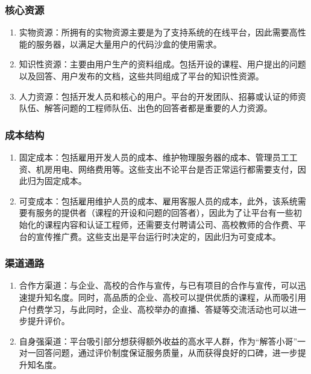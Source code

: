 \documentclass[a4paper]{ctexart}
\begin{document}
\subsubsection{核心资源}

\begin{enumerate}[label=\alph*.]
  \item 实物资源：所拥有的实物资源主要是为了支持系统的在线平台，因此需要高性能的服务器，以满足大量用户的代码沙盒的使用需求。
  \item 知识性资源：主要由用户生产的资料组成。包括开设的课程、用户提出的问题以及回答、用户发布的文档，这些共同组成了平台的知识性资源。
  \item 人力资源：包括开发人员和核心的用户。平台的开发团队、招募或认证的师资队伍、解答问题的工程师队伍、出色的回答者都是重要的人力资源。
\end{enumerate}

\subsubsection{成本结构}

\begin{enumerate}[label=\alph*.]
  \item 固定成本：包括雇用开发人员的成本、维护物理服务器的成本、管理员工工资、机房用电、网络费用等。这些支出不论平台是否正常运行都需要支付，因此归为固定成本。
  \item 可变成本：包括雇用维护人员的成本、雇用客服人员的成本，此外，该系统需要有服务的提供者（课程的开设和问题的回答者），因此为了让平台有一些初始化的课程内容和认证工程师，还需要支付聘请公司、高校教师的合作费、平台的宣传推广费。这些支出是平台运行时决定的，因此归为可变成本。
\end{enumerate}

\subsubsection{渠道通路}

\begin{enumerate}[label=\alph*.]
  \item 合作方渠道：与企业、高校的合作与宣传，与已有项目的合作与宣传，可以迅速提升知名度。同时，高品质的企业、高校可以提供优质的课程，从而吸引用户付费学习，与此同时，企业、高校举办的直播、答疑等交流活动也可以进一步提升评价。
  \item 自身强渠道：平台吸引部分想获得额外收益的高水平人群，作为“解答小哥”一对一回答问题，通过评价制度保证服务质量，从而获得良好的口碑，进一步提升知名度。
\end{enumerate}
\end{document}
